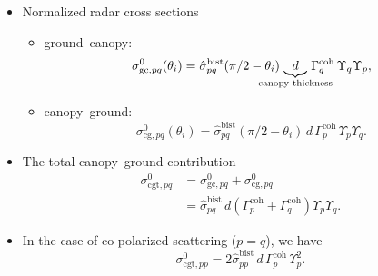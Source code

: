 \documentclass[11pt, oneside]{article}
\newcommand{\sbist}{\hat{\sigma}^\mathrm{bist}_{pq}}
\newcommand{\Gc}[1]{\Gamma_{#1}^\mathrm{coh}}
\begin{document}
\begin{itemize}
	\item Normalized radar cross sections
	\begin{itemize}
		\item[] ground--canopy:
		\begin{equation}
			\label{e:sgc}
			\sigma^0_{\mathrm{gc},pq}(\theta_i) = \sbist(\pi/2 - \theta_i)\,\underbrace{d}_{\mathclap{\text{canopy thickness}}}\,\Gc{q}\,\Upsilon_q\Upsilon_p,
		\end{equation}
		\item[] canopy--ground:
		\begin{equation}
			\label{e:scg}
			\sigma^0_{\mathrm{cg},pq}(\theta_i) = \sbist(\pi/2 - \theta_i)\,d\,\Gc{p}\,\Upsilon_p\Upsilon_q.
		\end{equation}
	\end{itemize}
	\item The total canopy--ground contribution
	\begin{align}
		\sigma^0_{\mathrm{cgt},pq} &= \sigma^0_{\mathrm{gc},pq} + \sigma^0_{\mathrm{cg},pq} \nonumber\\
		&= \sbist\,d\left(\Gc{p} + \Gc{q}\right)\Upsilon_p\Upsilon_q. \label{e:scgt}
	\end{align}
	\item In the case of co-polarized scattering ($p=q$), we have
	\begin{equation}
		\label{e:scgt_inc}
		\sigma^0_{\mathrm{cgt},pp} = 2\hat{\sigma}^\mathrm{bist}_{pp}\,d\,\Gc{p}\,\Upsilon_p^2.
	\end{equation}

\end{itemize}
\end{document}
